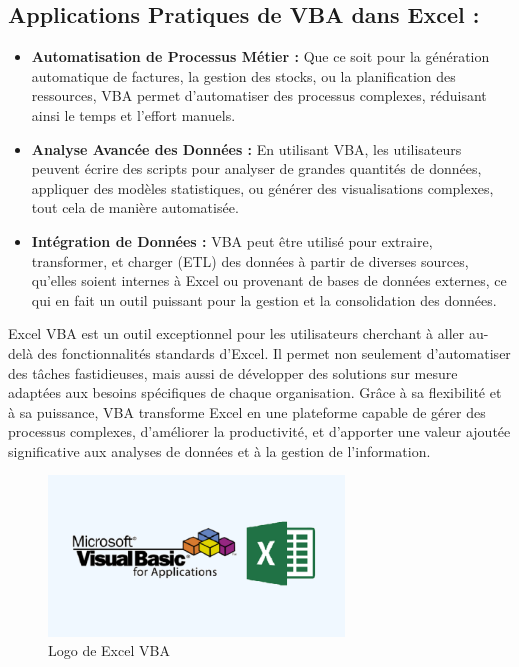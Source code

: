 \documentclass[a4paper, oneside, 12pt, final]{extreport}
\begin{document}
\subsection{Applications Pratiques de VBA dans Excel :}
\begin{itemize}
\item \textbf{Automatisation de Processus Métier :} Que ce soit pour la génération automatique de factures, la gestion des stocks, ou la planification des ressources, VBA permet d'automatiser des processus complexes, réduisant ainsi le temps et l'effort manuels.
\item \textbf{Analyse Avancée des Données :} En utilisant VBA, les utilisateurs peuvent écrire des scripts pour analyser de grandes quantités de données, appliquer des modèles statistiques, ou générer des visualisations complexes, tout cela de manière automatisée.
\item \textbf{Intégration de Données :} VBA peut être utilisé pour extraire, transformer, et charger (ETL) des données à partir de diverses sources, qu'elles soient internes à Excel ou provenant de bases de données externes, ce qui en fait un outil puissant pour la gestion et la consolidation des données.
\end{itemize}
Excel VBA est un outil exceptionnel pour les utilisateurs cherchant à aller au-delà des fonctionnalités standards d'Excel. Il permet non seulement d'automatiser des tâches fastidieuses, mais aussi de développer des solutions sur mesure adaptées aux besoins spécifiques de chaque organisation. Grâce à sa flexibilité et à sa puissance, VBA transforme Excel en une plateforme capable de gérer des processus complexes, d'améliorer la productivité, et d'apporter une valeur ajoutée significative aux analyses de données et à la gestion de l'information.
\begin{figure}[h]
    \centering
    \includegraphics[width=0.7\textwidth]{Microsoft Excel VBA.png} %
    \caption{Logo de Excel VBA}
    \label{fig:Logo de Excel VBA}
\end{figure}
\end{document}
